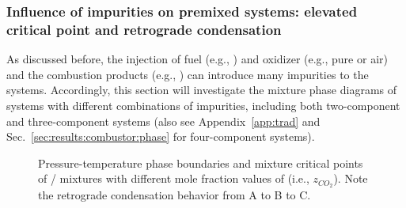 \subsubsection{Influence of impurities on premixed  systems: elevated critical point and retrograde condensation}
\label{sec:results:combustor:H2O}


As discussed before, the injection of fuel (e.g., ) and oxidizer (e.g., pure  or air) and the combustion products (e.g., ) can introduce many impurities to the  systems. Accordingly, this section will investigate the mixture phase diagrams of  systems with different combinations of impurities, including both two-component and three-component systems (also see Appendix~\ref{app:trad} and Sec.~\ref{sec:results:combustor:phase} for four-component systems).

    \begin{figure}[htb]
        \centering
        \caption{Pressure-temperature phase boundaries and mixture critical points of / mixtures with different mole fraction values of  (i.e., $z_{CO_2}$). Note the retrograde condensation behavior from A to B to C.}\label{v3}

    \end{figure}

